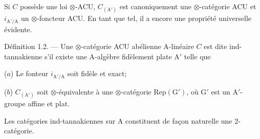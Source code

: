 Si $C$ possède une loi $\otimes$-ACU, $C_{(\mathrm{A}')}$ est canoniquement une $\otimes$-catégorie
ACU et $i_{\mathrm{A}'/\mathrm{A}}$ un $\otimes$-foncteur ACU. En tant que tel, il a encore une propriété
universelle évidente.

Définition 1.2. --- Une $\otimes$-catégorie ACU abélienne A-linéaire $C$ est
dite ind-tannakienne s'il existe une A-algèbre fidèlement plate A$'$ telle que

($a$) Le fonteur $i_{\mathrm{A}'/\mathrm{A}}$ soit fidèle et exact;

($b$) $C_{(\mathrm{A}')}$ soit $\otimes$-équivalente à une $\otimes$-catégorie $\mathrm{Rep}(\mathrm{G}')$, où G$'$ est un
A$'$-groupe affine et plat.

Les catégories ind-tannakiennes sur A constituent de façon naturelle
une 2-catégorie.

